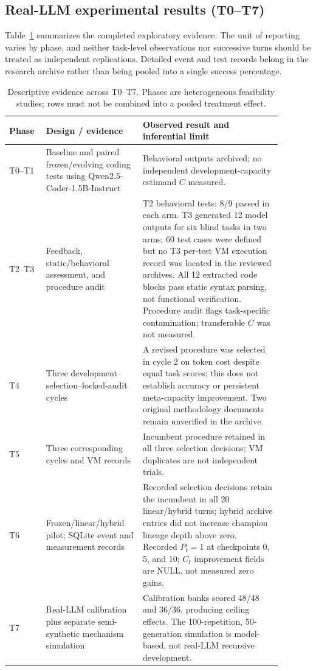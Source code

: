 \documentclass[11pt,a4paper]{article}
\begin{document}
\subsection{Real-LLM experimental results (T0--T7)}\label{sec:real-llm-results}
Table~\ref{tab:real-llm-summary} summarizes the completed exploratory evidence. The unit of reporting varies by phase, and neither task-level observations nor successive turns should be treated as independent replications. Detailed event and test records belong in the research archive rather than being pooled into a single success percentage.
\begin{table}[htbp]
\centering\small
\begin{tabular}{p{0.11\linewidth}p{0.32\linewidth}p{0.46\linewidth}}
\hline
Phase & Design / evidence & Observed result and inferential limit \\
\hline
T0--T1 & Baseline and paired frozen/evolving coding tests using Qwen2.5-Coder-1.5B-Instruct & Behavioral outputs archived; no independent development-capacity estimand $C$ measured. \\
T2--T3 & Feedback, static/behavioral assessment, and procedure audit & T2 behavioral tests: 8/9 passed in each arm. T3 generated 12 model outputs for six blind tasks in two arms; 60 test cases were defined but no T3 per-test VM execution record was located in the reviewed archives. All 12 extracted code blocks pass static syntax parsing, not functional verification. Procedure audit flags task-specific contamination; transferable $C$ was not measured. \\
T4 & Three development--selection--locked-audit cycles & A revised procedure was selected in cycle 2 on token cost despite equal task scores; this does not establish accuracy or persistent meta-capacity improvement. Two original methodology documents remain unverified in the archive. \\
T5 & Three corresponding cycles and VM records & Incumbent procedure retained in all three selection decisions; VM duplicates are not independent trials. \\
T6 & Frozen/linear/hybrid pilot; SQLite event and measurement records & Recorded selection decisions retain the incumbent in all 20 linear/hybrid turns; hybrid archive entries did not increase champion lineage depth above zero. Recorded $P_t=1$ at checkpoints 0, 5, and 10; $C_t$ improvement fields are NULL, not measured zero gains. \\
T7 & Real-LLM calibration plus separate semi-synthetic mechanism simulation & Calibration banks scored 48/48 and 36/36, producing ceiling effects. The 100-repetition, 50-generation simulation is model-based, not real-LLM recursive development. \\
\hline
\end{tabular}
\caption{Descriptive evidence across T0--T7. Phases are heterogeneous feasibility studies; rows must not be combined into a pooled treatment effect.}\label{tab:real-llm-summary}
\end{table}
\end{document}
